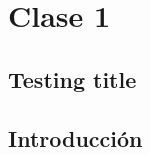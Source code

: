 


	\section[Clase 1 -- {\it Introducción a la optimización}]{Clase 1}
	
	\subsection{Testing title}
	
	\lipsum[1-2]
	
	\subsection{Introducción}
	
	\lipsum[3]	


